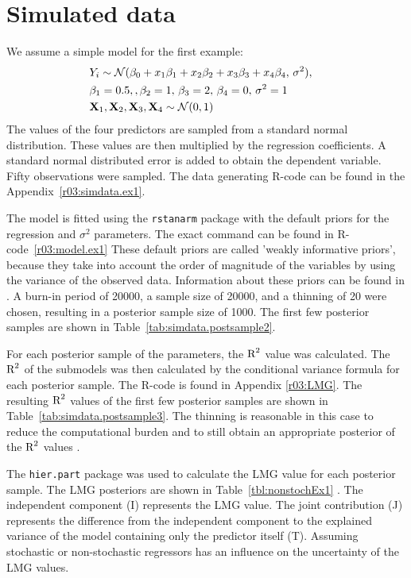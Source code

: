 \documentclass[11pt,a4paper,twoside]{book}\usepackage[]{graphicx}\usepackage[]{color}
\begin{document}
\section{Simulated data}

We assume a simple model for the first example: 
\begin{align*} 
&Y_{i} \sim \mathcal{N}(\beta_{0}+x_{1} \beta_{1}+x_{2} \beta_{2}+x_{3} \beta_{3}+x_{4} \beta_{4}, \, \sigma^2),& \\ & \beta_{1} = 0.5, , \beta_{2} = 1, \, \beta_{3} = 2 , \, \beta_{4}=0, \, \sigma^2 = 1 & \\ & {\mathbf{X}}_{1}, {\mathbf{X}}_{2},{\mathbf{X}}_{3},{\mathbf{X}}_{4} \sim \mathcal{N}(0, 1) 
\end{align*} 
The values of the four predictors are sampled from a standard normal distribution. These values are then multiplied by the regression coefficients. A standard normal distributed error is added to obtain the dependent variable. Fifty observations were sampled. The data generating R-code can be found in the Appendix~\ref{r03:simdata.ex1}.




The model is fitted using the \texttt{rstanarm} package \citep{rstanarm} with the default priors for the regression and $\sigma^2$ parameters. The exact command can be found in R-code~\ref{r03:model.ex1} These default priors are called 'weakly informative priors', because they take into account the order of magnitude of the variables by using the variance of the observed data. Information about these priors can be found in \cite{stanM2017}. A burn-in period of 20000, a sample size of 20000, and a thinning of 20 were chosen, resulting in a posterior sample size of 1000. The first few posterior samples are shown in Table~\ref{tab:simdata.postsample2}. 

For each posterior sample of the parameters, the $\text{R}^2$ value was calculated. The $\text{R}^2$ of the submodels was then calculated by the conditional variance formula for each posterior sample. The R-code is found in Appendix \ref{r03:LMG}. The resulting $\text{R}^2$ values of the first few posterior samples are shown in Table~\ref{tab:simdata.postsample3}.  The thinning is reasonable in this case to reduce the computational burden and to still obtain an appropriate posterior of the $\text{R}^2$ values \citep{Link2012}. 

The \texttt{hier.part} package was used to calculate the LMG value for each posterior sample. The LMG posteriors are shown in Table~\ref{tbl:nonstochEx1} . The independent component (I) represents the LMG value. The joint contribution (J) represents the difference from the independent component to the explained variance of the model containing only the predictor itself (T). Assuming stochastic or non-stochastic regressors has an influence on the uncertainty of the LMG values. 
\end{document}
